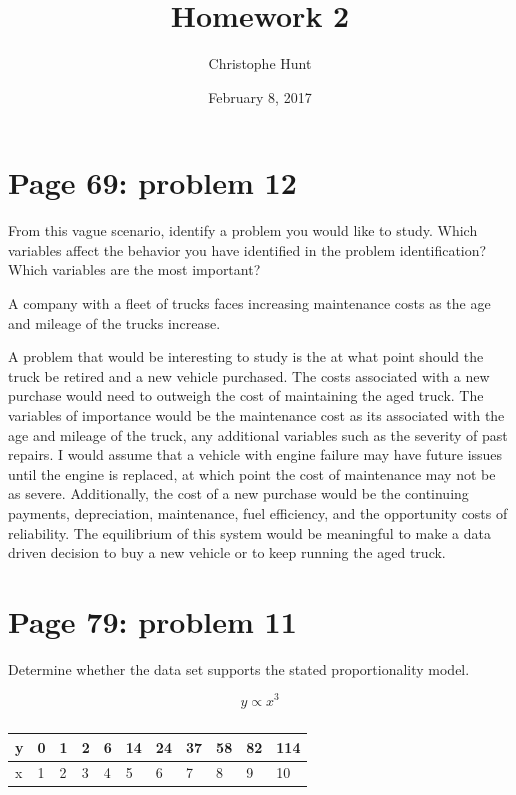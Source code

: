 \documentclass[]{article}
\title{Homework 2}
\author{Christophe Hunt}
\date{February 8, 2017}
\begin{document}
\maketitle

{
\setcounter{tocdepth}{2}
\tableofcontents
}
\section{Page 69: problem 12}\label{page-69-problem-12}

From this vague scenario, identify a problem you would like to study.
Which variables affect the behavior you have identified in the problem
identification? Which variables are the most important?

A company with a fleet of trucks faces increasing maintenance costs as
the age and mileage of the trucks increase.

A problem that would be interesting to study is the at what point should
the truck be retired and a new vehicle purchased. The costs associated
with a new purchase would need to outweigh the cost of maintaining the
aged truck. The variables of importance would be the maintenance cost as
its associated with the age and mileage of the truck, any additional
variables such as the severity of past repairs. I would assume that a
vehicle with engine failure may have future issues until the engine is
replaced, at which point the cost of maintenance may not be as severe.
Additionally, the cost of a new purchase would be the continuing
payments, depreciation, maintenance, fuel efficiency, and the
opportunity costs of reliability. The equilibrium of this system would
be meaningful to make a data driven decision to buy a new vehicle or to
keep running the aged truck.

\newpage

\section{Page 79: problem 11}\label{page-79-problem-11}

Determine whether the data set supports the stated proportionality
model.

\[y \propto x^3\]

\begin{table}[!htbp]
\centering
\caption{}
\label{my-label}
\begin{tabular}{l|llllllllll}
y & 0 & 1 & 2 & 6 & 14 & 24 & 37 & 58 & 82 & 114 \\ \hline
x & 1 & 2 & 3 & 4 & 5 & 6 & 7 & 8 & 9 & 10
\end{tabular}
\end{table}
\end{document}

